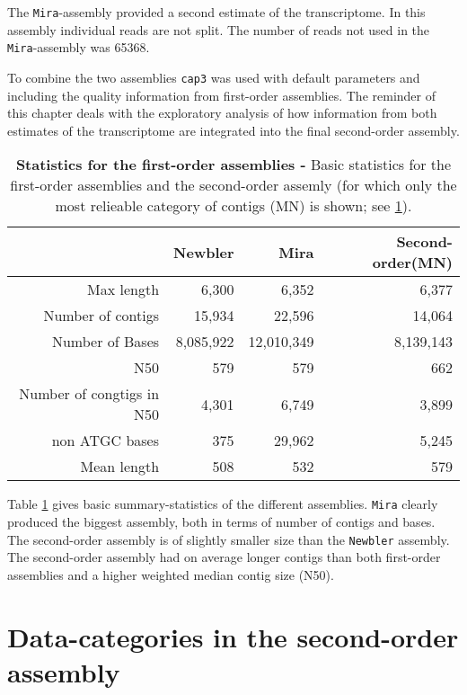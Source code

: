 The \texttt{Mira}-assembly provided a second estimate of the
transcriptome. In this assembly individual reads are not split. The
number of reads not used in the \texttt{Mira}-assembly was 65368.

To combine the two assemblies \texttt{cap3} was used with default
parameters and including the quality information from first-order
assemblies. The reminder of this chapter deals with the exploratory
analysis of how information from both estimates of the transcriptome
are integrated into the final second-order assembly.

\begin{table}[ht]
\begin{center}
\begin{tabular}{rrrr}
  \hline
 & Newbler & Mira & Second-order(MN) \\ 
  \hline
Max length & 6,300 & 6,352 & 6,377 \\ 
  Number of contigs & 15,934 & 22,596 & 14,064 \\ 
  Number of Bases & 8,085,922 & 12,010,349 & 8,139,143 \\ 
  N50 & 579 & 579 & 662 \\ 
  Number of congtigs in N50 & 4,301 & 6,749 & 3,899 \\ 
  non ATGC bases & 375 & 29,962 & 5,245 \\ 
  Mean length & 508 & 532 & 579 \\ 
   \hline
\end{tabular}
\caption[Statistics for the first-order assemblies]{\textbf{Statistics
    for the first-order assemblies -} Basic statistics for the
  first-order assemblies and the second-order assemly (for which only
  the most relieable category of contigs (MN) is shown; see
  \ref{sec:data-categ-second}).}
\label{tab:pc}
\end{center}
\end{table}


Table \ref{tab:pc} gives basic summary-statistics of the different
assemblies. \texttt{Mira} clearly produced the biggest assembly, both
in terms of number of contigs and bases. The second-order assembly is
of slightly smaller size than the \texttt{Newbler} assembly. The
second-order assembly had on average longer contigs than both
first-order assemblies and a higher weighted median contig size (N50).

\section{Data-categories in the second-order assembly}
\label{sec:data-categ-second}

